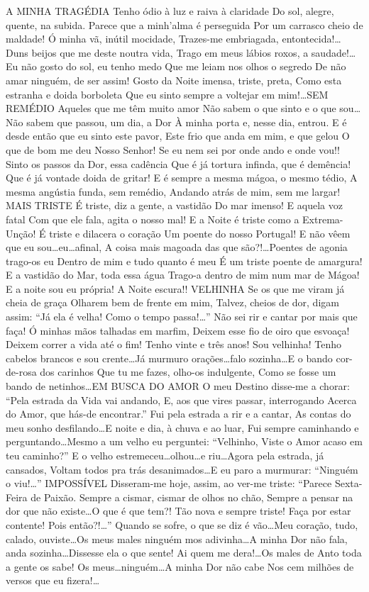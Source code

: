 A MINHA TRAGÉDIA Tenho ódio à luz e raiva à claridade Do sol, alegre, quente, na subida. Parece que a minh’alma é perseguida Por um carrasco cheio de maldade! Ó minha vã, inútil mocidade, Trazes-me embriagada, entontecida!\ldots Duns beijos que me deste noutra vida, Trago em meus lábios roxos, a saudade!\ldots Eu não gosto do sol, eu tenho medo Que me leiam nos olhos o segredo De não amar ninguém, de ser assim! Gosto da Noite imensa, triste, preta, Como esta estranha e doida borboleta Que eu sinto sempre a voltejar em mim!\ldots SEM REMÉDIO Aqueles que me têm muito amor Não sabem o que sinto e o que sou\ldots Não sabem que passou, um dia, a Dor À minha porta e, nesse dia, entrou. E é desde então que eu sinto este pavor, Este frio que anda em mim, e que gelou O que de bom me deu Nosso Senhor! Se eu nem sei por onde ando e onde vou!! Sinto os passos da Dor, essa cadência Que é já tortura infinda, que é demência! Que é já vontade doida de gritar! E é sempre a mesma mágoa, o mesmo tédio, A mesma angústia funda, sem remédio, Andando atrás de mim, sem me largar! MAIS TRISTE É triste, diz a gente, a vastidão Do mar imenso! E aquela voz fatal Com que ele fala, agita o nosso mal! E a Noite é triste como a Extrema-Unção! É triste e dilacera o coração Um poente do nosso Portugal! E não vêem que eu sou\ldots eu\ldots afinal, A coisa mais magoada das que são?!\ldots Poentes de agonia trago-os eu Dentro de mim e tudo quanto é meu É um triste poente de amargura! E a vastidão do Mar, toda essa água Trago-a dentro de mim num mar de Mágoa! E a noite sou eu própria! A Noite escura!! VELHINHA 
Se os que me viram já cheia de graça Olharem bem de frente em mim, Talvez, cheios de dor, digam assim: “Já ela é velha! Como o tempo passa!\ldots   ” Não sei rir e cantar por mais que faça! Ó minhas mãos talhadas em marfim, Deixem esse fio de oiro que esvoaça! Deixem correr a vida até o fim! Tenho vinte e três anos! Sou velhinha! Tenho cabelos brancos e sou crente\ldots Já murmuro orações\ldots falo sozinha\ldots E o bando cor-de-rosa dos carinhos Que tu me fazes, olho-os indulgente, Como se fosse um bando de netinhos\ldots EM BUSCA DO AMOR O meu Destino disse-me a chorar: “Pela estrada da Vida vai andando, E, aos que vires passar, interrogando Acerca do Amor, que hás-de encontrar.” Fui pela estrada a rir e a cantar, As contas do meu sonho desfilando\ldots E noite e dia, à chuva e ao luar, Fui sempre caminhando e perguntando\ldots Mesmo a um velho eu perguntei: “Velhinho, Viste o Amor acaso em teu caminho?” E o velho estremeceu\ldots olhou\ldots e riu\ldots Agora pela estrada, já cansados, Voltam todos pra trás desanimados\ldots E eu paro a murmurar: “Ninguém o viu!\ldots   ” 
IMPOSSÍVEL Disseram-me hoje, assim, ao ver-me triste: “Parece Sexta-Feira de Paixão. Sempre a cismar, cismar de olhos no chão, Sempre a pensar na dor que não existe\ldots O que é que tem?! Tão nova e sempre triste! Faça por estar contente! Pois então?!\ldots   ” Quando se sofre, o que se diz é vão\ldots Meu coração, tudo, calado, ouviste\ldots Os meus males ninguém mos adivinha\ldots A minha Dor não fala, anda sozinha\ldots Dissesse ela o que sente! Ai quem me dera!\ldots Os males de Anto toda a gente os sabe! Os meus\ldots ninguém\ldots A minha Dor não cabe Nos cem milhões de versos que eu fizera!\ldots 